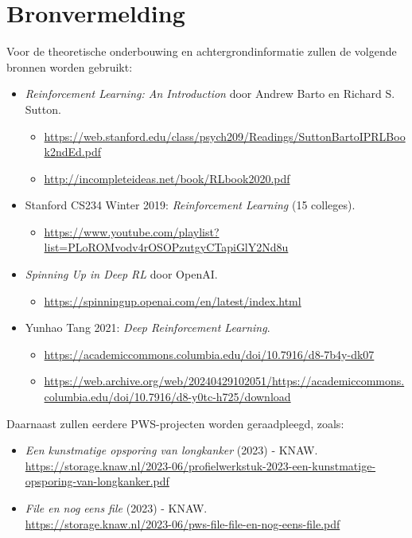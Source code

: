 \documentclass[a4paper,12pt]{article}
\begin{document}
\section{Bronvermelding}
Voor de theoretische onderbouwing en achtergrondinformatie zullen de volgende
bronnen worden gebruikt:
\begin{itemize}
    \item \textit{Reinforcement Learning: An Introduction} door Andrew Barto en Richard S. Sutton.
          \begin{itemize}
              \item \url{https://web.stanford.edu/class/psych209/Readings/SuttonBartoIPRLBook2ndEd.pdf}
              \item \url{http://incompleteideas.net/book/RLbook2020.pdf}
          \end{itemize}
    \item Stanford CS234 Winter 2019: \textit{Reinforcement Learning} (15 colleges).
          \begin{itemize}
              \item \url{https://www.youtube.com/playlist?list=PLoROMvodv4rOSOPzutgyCTapiGlY2Nd8u}
          \end{itemize}
    \item \textit{Spinning Up in Deep RL} door OpenAI.
          \begin{itemize}
              \item \url{https://spinningup.openai.com/en/latest/index.html}
          \end{itemize}

    \item Yunhao Tang 2021: \textit{Deep Reinforcement Learning}.
          \begin{itemize}
              \item \url{https://academiccommons.columbia.edu/doi/10.7916/d8-7b4y-dk07}
              \item \url{https://web.archive.org/web/20240429102051/https://academiccommons.columbia.edu/doi/10.7916/d8-y0tc-h725/download}
          \end{itemize}
\end{itemize}
Daarnaast zullen eerdere PWS-projecten worden geraadpleegd, zoals:
\begin{itemize}
    \item \textit{Een kunstmatige opsporing van longkanker} (2023) - KNAW. \\
          \url{https://storage.knaw.nl/2023-06/profielwerkstuk-2023-een-kunstmatige-opsporing-van-longkanker.pdf}
    \item \textit{File en nog eens file} (2023) - KNAW. \\
          \url{https://storage.knaw.nl/2023-06/pws-file-file-en-nog-eens-file.pdf}
\end{itemize}
\end{document}
